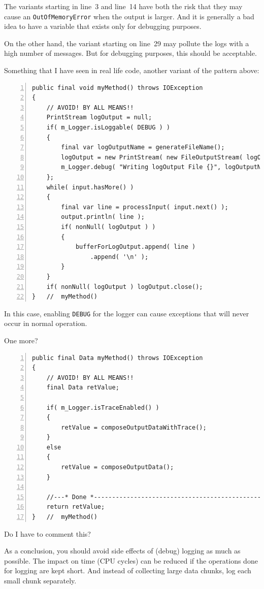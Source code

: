 \documentclass[11pt,a4paper, titlepage, parskip=half, headsepline, footsepline, cleardoublepage=current, headheight=1cm]{scrbook}
\begin{document}
The variants starting in line~3 and line~14 have both the risk that they may cause an \lstinline|OutOfMemoryError| when the output is larger. And it is generally a bad idea to have a variable that exists only for debugging purposes.

On the other hand, the variant starting on line~29 may pollute the logs with a high number of messages. But for debugging purposes, this should be acceptable.

Something that I have seen in real life code, another variant of the pattern above:
\begin{lstlisting}[numbers=left]
public final void myMethod() throws IOException
{
    // AVOID! BY ALL MEANS!!
    PrintStream logOutput = null;
    if( m_Logger.isLoggable( DEBUG ) )
    {
    	final var logOutputName = generateFileName();
    	logOutput = new PrintStream( new FileOutputStream( logOutputName ) );
    	m_Logger.debug( "Writing logOutput File {}", logOutputName );
    };
    while( input.hasMore() )
    {
        final var line = processInput( input.next() );
        output.println( line );
        if( nonNull( logOutput ) )
        {
        	bufferForLogOutput.append( line )
            	.append( '\n' );
        }
    }
    if( nonNull( logOutput ) logOutput.close();
}   //  myMethod()
\end{lstlisting}

In this case, enabling \verb#DEBUG# for the logger can cause exceptions that will never occur in normal operation.

One more?
\begin{lstlisting}[numbers=left]
public final Data myMethod() throws IOException
{
    // AVOID! BY ALL MEANS!!
    final Data retValue;
    
    if( m_Logger.isTraceEnabled() )
    {
        retValue = composeOutputDataWithTrace();
    }
    else
    {
        retValue = composeOutputData();
    }
    
    //---* Done *----------------------------------------------------
    return retValue;
}   //  myMethod()
\end{lstlisting}
Do I have to comment this?

As a conclusion, you should avoid side effects of (debug) logging as much as possible. The impact on time (CPU cycles) can be reduced if the operations done for logging are kept short. And instead of collecting large data chunks, log each small chunk separately.

\end{document}
